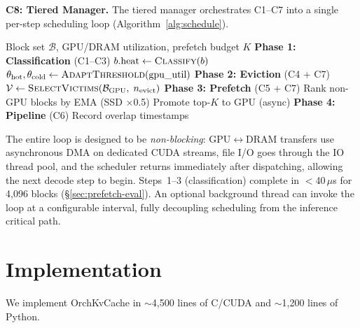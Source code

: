 \documentclass[conference]{IEEEtran}
\begin{document}
\textbf{C8: Tiered Manager.} The tiered manager orchestrates C1--C7 into a single per-step scheduling loop (Algorithm~\ref{alg:schedule}).

\begin{algorithm}[t]
\caption{Per-Step Scheduling Loop (C8: Tiered Manager)}
\label{alg:schedule}
\begin{algorithmic}
\Require Block set $\mathcal{B}$, GPU/DRAM utilization, prefetch budget $K$
\Statex
\Statex \textbf{Phase 1: Classification} (C1--C3)
    $b.\text{heat} \gets \Call{Classify}{b}$ 
\EndFor
\State $\theta_{\text{hot}}, \theta_{\text{cold}} \gets \Call{AdaptThreshold}{\text{gpu\_util}}$ 
\Statex
\Statex \textbf{Phase 2: Eviction} (C4 + C7)
    \State $\mathcal{V} \gets \Call{SelectVictims}{\mathcal{B}_{\text{GPU}},\; n_{\text{evict}}}$ 
    \State {} 
\EndIf
{}
    \State {} 
\EndIf
\Statex
\Statex \textbf{Phase 3: Prefetch} (C5 + C7)
\State Rank non-GPU blocks by EMA (SSD $\times$0.5) 
\State Promote top-$K$ to GPU (async) 
\Statex
\Statex \textbf{Phase 4: Pipeline} (C6)
\State Record overlap timestamps
\end{algorithmic}
\end{algorithm}

The entire loop is designed to be \emph{non-blocking}: GPU$\leftrightarrow$DRAM transfers use asynchronous DMA on dedicated CUDA streams, file I/O goes through the IO thread pool, and the scheduler returns immediately after dispatching, allowing the next decode step to begin. Steps~1--3 (classification) complete in $<$40\,$\mu$s for 4,096 blocks (\S\ref{sec:prefetch-eval}). An optional background thread can invoke the loop at a configurable interval, fully decoupling scheduling from the inference critical path.


\section{Implementation}

We implement OrchKvCache in ${\sim}$4,500 lines of C/CUDA and ${\sim}$1,200 lines of Python.
\end{document}
